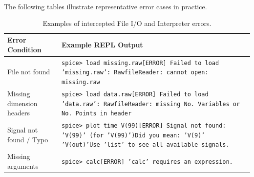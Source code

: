 The following tables illustrate representative error cases in practice.

\begin{table}[H]
    \centering
    \caption{Examples of intercepted File I/O and Interpreter errors.}
    \label{tab:err_file_interp}
    \renewcommand{\arraystretch}{1.3}
    \begin{tabularx}{\textwidth}{@{} >{\raggedright\arraybackslash}p{4cm} >{\raggedright\arraybackslash}X @{}}
        \toprule
        \textbf{Error Condition} & \textbf{Example REPL Output} \\
        \midrule
        File not found 
        & \texttt{spice> load missing.raw}\newline \texttt{[ERROR] Failed to load 'missing.raw': RawfileReader: cannot open: missing.raw} \\
        Missing dimension headers 
        & \texttt{spice> load data.raw}\newline \texttt{[ERROR] Failed to load 'data.raw': RawfileReader: missing No. Variables or No. Points in header} \\
        \midrule
        Signal not found / Typo 
        & \texttt{spice> plot time V(99)}\newline \texttt{[ERROR] Signal not found: 'V(99)' (for 'V(99)')}\newline \texttt{Did you mean: 'V(9)' 'V(out)'}\newline \texttt{Use 'list' to see all available signals.} \\
        Missing arguments
        & \texttt{spice> calc}\newline \texttt{[ERROR] 'calc' requires an expression.} \\
        \bottomrule
    \end{tabularx}
\end{table}

